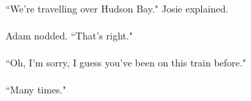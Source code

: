 \documentclass{article}
\begin{document}
\paragraph{}
``We're travelling over Hudson Bay." Josie explained.

\paragraph{}
Adam nodded. ``That's right."

\paragraph{}
``Oh, I'm sorry, I guess you've been on this train before."

\paragraph{}
``Many times."
\end{document}
